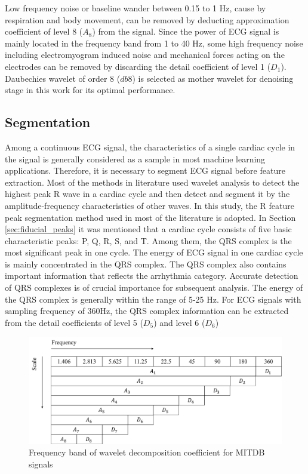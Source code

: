 Low frequency noise or baseline wander between 0.15 to 1 Hz, cause by respiration and body movement, can be removed by deducting approximation coefficient of level 8 ($A_8$) from the signal. Since the power of ECG signal is mainly located in the frequency band from 1 to 40 Hz, some high frequency noise including electromyogram induced noise and mechanical forces acting on the electrodes can be removed by discarding the detail coefficient of level 1 ($D_1$). Daubechies wavelet of order 8 ($db8$) is selected as mother wavelet for denoising stage in this work for its optimal performance\cite{denoise}.

\subsection{Segmentation}

Among a continuous ECG signal, the characteristics of a single cardiac cycle in the signal is generally considered as a sample in most machine learning applications. Therefore, it is necessary to segment ECG signal before feature extraction. Most of the methods in literature used wavelet analysis to detect the highest peak R wave in a cardiac cycle and then detect and segment it by the amplitude-frequency characteristics of other waves. In this study, the R feature peak segmentation method used in most of the literature is adopted. In Section \ref{sec:fiducial_peaks} it was mentioned that a cardiac cycle consists of five basic characteristic peaks: P, Q, R, S, and T. Among them, the QRS complex is the most significant peak in one cycle. The energy of ECG signal in one cardiac cycle is mainly concentrated in the QRS complex. The QRS complex also contains important information that reflects the arrhythmia category\cite{2012qrs}. Accurate detection of QRS complexes is of crucial importance for subsequent analysis. The energy of the QRS complex is generally within the range of 5-25 Hz. For ECG signals with sampling frequency of 360Hz, the QRS complex information can be extracted from the detail coefficients of level 5 ($D_5$) and level 6 ($D_6$)

\begin{figure}[t]
\centering
\includegraphics[scale=.5]{Fig/scale_wavelet.png}
\caption{Frequency band of wavelet decomposition coefficient for MITDB signals}
\label{fig:wavelet_decomp}
\end{figure}


